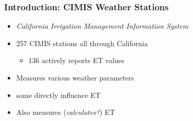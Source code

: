 \begin{frame}
\frametitle{Introduction: CIMIS Weather Stations}
\begin{itemize}
\setlength\itemsep{1em}
\item \textit{California Irrigation Management Information System}
\item 257 CIMIS stations all through California\\
	\begin{itemize}
		\item 136 actively reports ET values
	\end{itemize}
\item Measures various weather parameters
\item some directly influence ET
\item Also measures (\textit{calculates?}) ET 
\end{itemize}
\end{frame}
